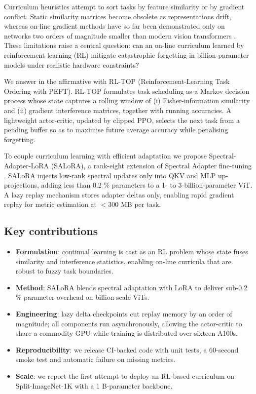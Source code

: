 \documentclass{article}
\begin{document}
Curriculum heuristics attempt to sort tasks by feature similarity or by gradient conflict. Static similarity matrices become obsolete as representations drift, whereas on-line gradient methods have so far been demonstrated only on networks two orders of magnitude smaller than modern vision transformers \cite{bengio-2020-interference,ke-2021-continual}. These limitations raise a central question: can an on-line curriculum learned by reinforcement learning (RL) mitigate catastrophic forgetting in billion-parameter models under realistic hardware constraints?

We answer in the affirmative with RL-TOP (Reinforcement-Learning Task Ordering with PEFT). RL-TOP formulates task scheduling as a Markov decision process whose state captures a rolling window of (i) Fisher-information similarity and (ii) gradient interference matrices, together with running accuracies. A lightweight actor-critic, updated by clipped PPO, selects the next task from a pending buffer so as to maximise future average accuracy while penalising forgetting.

To couple curriculum learning with efficient adaptation we propose Spectral-Adapter-LoRA (SALoRA), a rank-eight extension of Spectral Adapter fine-tuning \cite{zhang-2024-spectral}. SALoRA injects low-rank spectral updates only into QKV and MLP up-projections, adding less than 0.2 \% parameters to a 1- to 3-billion-parameter ViT. A lazy replay mechanism stores adapter deltas only, enabling rapid gradient replay for metric estimation at $< 300$ MB per task.

\subsection{Key contributions}
\begin{itemize}
  \item \textbf{Formulation}: continual learning is cast as an RL problem whose state fuses similarity and interference statistics, enabling on-line curricula that are robust to fuzzy task boundaries.
  \item \textbf{Method}: SALoRA blends spectral adaptation with LoRA to deliver sub-0.2 \% parameter overhead on billion-scale ViTs.
  \item \textbf{Engineering}: lazy delta checkpoints cut replay memory by an order of magnitude; all components run asynchronously, allowing the actor-critic to share a commodity GPU while training is distributed over sixteen A100s.
  \item \textbf{Reproducibility}: we release CI-backed code with unit tests, a 60-second smoke test and automatic failure on missing metrics.
  \item \textbf{Scale}: we report the first attempt to deploy an RL-based curriculum on Split-ImageNet-1K with a 1 B-parameter backbone.
\end{itemize}
\end{document}

